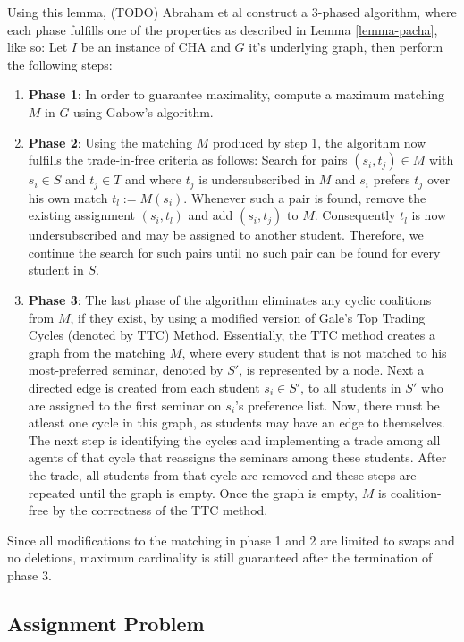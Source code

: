 Using this lemma, (TODO) Abraham et al \cite{Abraham:Pacha} construct a 3-phased algorithm, where each phase fulfills one of the properties as described in Lemma \ref{lemma-pacha}, like so: Let $I$ be an instance of CHA and $G$ it's underlying graph, then perform the following steps:
\begin{enumerate}
    \item \textbf{Phase 1}: In order to guarantee maximality, compute a maximum matching $M$ in $G$ using Gabow's algorithm. \cite{Gabow1983}
    \item \textbf{Phase 2}: Using the matching $M$ produced by step 1, the algorithm now fulfills the trade-in-free criteria as follows: Search for pairs $(s_i, t_j) \in M$ with $s_i \in S$ and $t_j \in T$ and where $t_j$ is undersubscribed in $M$ and $s_i$ prefers $t_j$ over his own match $t_l := M(s_i)$. Whenever such a pair is found, remove the existing assignment $(s_i, t_l)$ and add $(s_i, t_j)$ to $M$. Consequently $t_l$ is now undersubscribed and may be assigned to another student. Therefore, we continue the search for such pairs until no such pair can be found for every student in $S$.
    \item \textbf{Phase 3}: The last phase of the algorithm eliminates any cyclic coalitions from $M$, if they exist, by using a modified version of Gale's Top Trading Cycles (denoted by TTC) Method.\cite{ShapleyTTC} Essentially, the TTC method creates a graph from the matching $M$, where every student that is not matched to his most-preferred seminar, denoted by $S'$, is represented by a node. Next a directed edge is created from each student $s_i \in S'$, to all students in $S'$ who are assigned to the first seminar on $s_i$'s preference list. Now, there must be atleast one cycle in this graph, as students may have an edge to themselves. The next step is identifying the cycles and implementing a trade among all agents of that cycle that reassigns the seminars among these students. After the trade, all students from that cycle are removed and these steps are repeated until the graph is empty. Once the graph is empty, $M$ is coalition-free by the correctness of the TTC method.\cite{Abraham:Pacha}
\end{enumerate}

Since all modifications to the matching in phase 1 and 2 are limited to swaps and no deletions, maximum cardinality is still guaranteed after the termination of phase 3.

\subsection{Assignment Problem}

